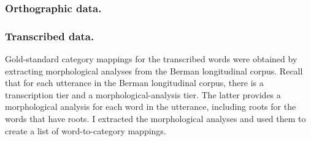 \subsubsection{Orthographic data.}

%
%

\subsubsection{Transcribed data.} Gold-standard category mappings for the 
transcribed words were obtained by extracting morphological analyses from the Berman 
longitudinal corpus. Recall that for each utterance in the Berman longitudinal corpus, 
there is a transcription tier and a morphological-analysis tier. The latter provides a 
morphological analysis for each word in the utterance, including roots for the words 
that have roots. I extracted the morphological analyses and used them to create a list of 
word-to-category mappings. %
